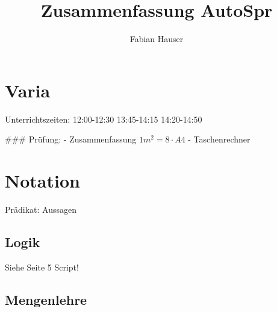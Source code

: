 

\title{Zusammenfassung AutoSpr}
\author{Fabian Hauser}
 

\maketitle

\section{Varia}
Unterrichtszeiten:
12:00-12:30
13:45-14:15
14:20-14:50

### Prüfung:
- Zusammenfassung $1m^2  = 8 \cdot A4 $
- Taschenrechner


\section{Notation}
Prädikat:	Aussagen

\subsection{Logik}
Siehe Seite 5 Script!

\subsection{Mengenlehre}


\underline{}


